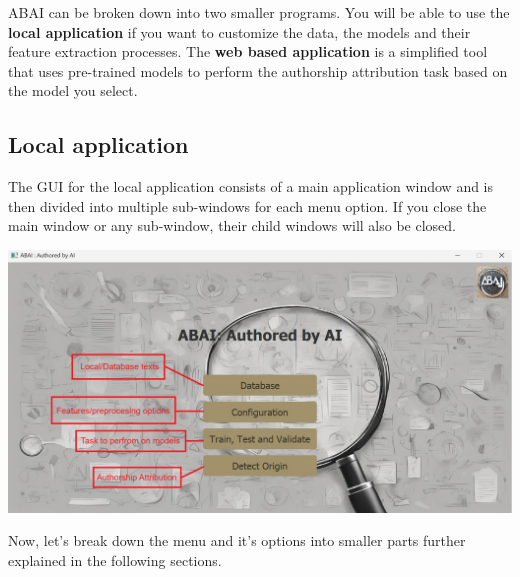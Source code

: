 ABAI can be broken down into two smaller programs. You will be able to use the \textbf{local application} if you want to customize the data, the models and their feature extraction processes. The \textbf{web based application} is a simplified tool that uses pre-trained models to perform the authorship attribution task based on the model you select. 

\subsection{Local application}
The GUI for the local application consists of a main application window and is then divided into multiple sub-windows for each menu option. If you close the main window or any sub-window, their child windows will also be closed. 
\begin{center}
    \includegraphics[width=17cm]{Images/Usage/Local/MainWindow.png}
\end{center}
Now, let's break down the menu and it's options into smaller parts further explained in the following sections.
\clearpage

